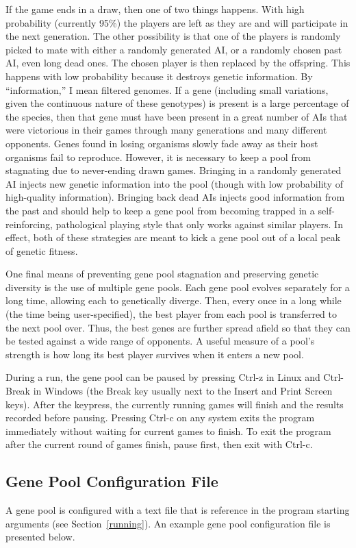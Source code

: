 \documentclass[letterpaper]{article}
\renewcommand{\_}{\allowbreak\textunderscore\allowbreak}
\begin{document}
If the game ends in a draw, then one of two things happens. With high probability (currently 95\%) the players are left as they are and will participate in the next generation. The other possibility is that one of the players is randomly picked to mate with either a randomly generated AI, or a randomly chosen past AI, even long dead ones. The chosen player is then replaced by the offspring. This happens with low probability because it destroys genetic information. By ``information,'' I mean filtered genomes. If a gene (including small variations, given the continuous nature of these genotypes) is present is a large percentage of the species, then that gene must have been present in a great number of AIs that were victorious in their games through many generations and many different opponents. Genes found in losing organisms slowly fade away as their host organisms fail to reproduce. However, it is necessary to keep a pool from stagnating due to never-ending drawn games. Bringing in a randomly generated AI injects new genetic information into the pool (though with low probability of high-quality information). Bringing back dead AIs injects good information from the past and should help to keep a gene pool from becoming trapped in a self-reinforcing, pathological playing style that only works against similar players. In effect, both of these strategies are meant to kick a gene pool out of a local peak of genetic fitness.

One final means of preventing gene pool stagnation and preserving genetic diversity is the use of multiple gene pools. Each gene pool evolves separately for a long time, allowing each to genetically diverge. Then, every once in a long while (the time being user-specified), the best player from each pool is transferred to the next pool over. Thus, the best genes are further spread afield so that they can be tested against a wide range of opponents. A useful measure of a pool's strength is how long its best player survives when it enters a new pool.

During a run, the gene pool can be paused by pressing Ctrl-z in Linux and Ctrl-Break in Windows (the Break key usually next to the Insert and Print Screen keys). After the keypress, the currently running games will finish and the results recorded before pausing. Pressing Ctrl-c on any system exits the program immediately without waiting for current games to finish. To exit the program after the current round of games finish, pause first, then exit with Ctrl-c.

\subsection{Gene Pool Configuration File}
A gene pool is configured with a text file that is reference in the program starting arguments (see Section~\ref{running}). An example gene pool configuration file is presented below.

\end{document}
